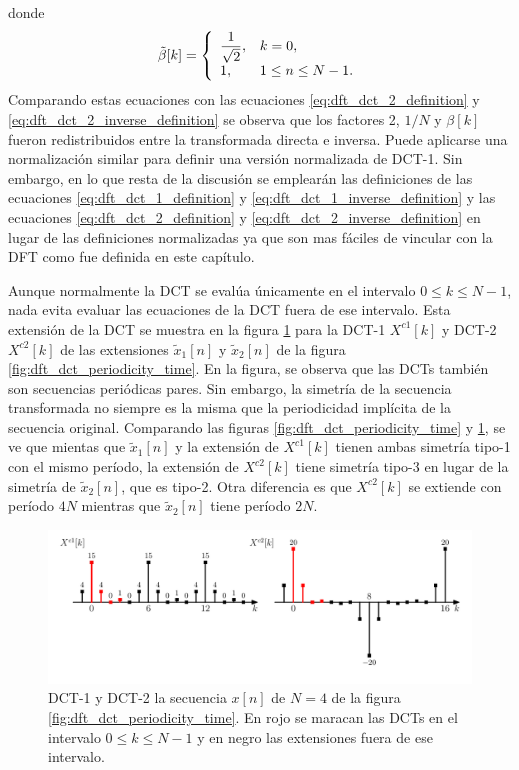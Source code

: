 \documentclass[a4paper]{report}
\begin{document}
donde
\[
 \tilde{\beta}[k]=
 \left\{ 
 \begin{array}{ll}
  \dfrac{1}{\sqrt{2}}, & k=0,\\[\medskipamount]
  1, & 1\leq n\leq N-1.
 \end{array}
 \right.  
\]
Comparando estas ecuaciones con las ecuaciones \ref{eq:dft_dct_2_definition} y \ref{eq:dft_dct_2_inverse_definition} se observa que los factores 2, \(1/N\) y \(\beta[k]\) fueron redistribuidos entre la transformada directa e inversa. Puede aplicarse una normalización similar para definir una versión normalizada de DCT-1. Sin embargo, en lo que resta de la discusión se emplearán las definiciones de las ecuaciones  \ref{eq:dft_dct_1_definition} y \ref{eq:dft_dct_1_inverse_definition} y las ecuaciones  \ref{eq:dft_dct_2_definition} y \ref{eq:dft_dct_2_inverse_definition} en lugar de las definiciones normalizadas ya que son mas fáciles de vincular con la DFT como fue definida en este capítulo.

Aunque normalmente la DCT se evalúa únicamente en el intervalo \(0\leq k\leq N-1\), nada evita evaluar las ecuaciones de la DCT fuera de ese intervalo. Esta extensión de la DCT se muestra en la figura \ref{fig:dft_dct_periodicity_types_1_2_dct} para la DCT-1 \(X^{c1}[k]\) y DCT-2 \(X^{c2}[k]\) de las extensiones \(\tilde{x}_1[n]\) y \(\tilde{x}_2[n]\) de la figura \ref{fig:dft_dct_periodicity_time}. En la figura, se observa que las DCTs también son secuencias periódicas pares. Sin embargo, la simetría de la secuencia transformada no siempre es la misma que la periodicidad implícita de la secuencia original. Comparando las figuras \ref{fig:dft_dct_periodicity_time} y \ref{fig:dft_dct_periodicity_types_1_2_dct}, se ve que mientas que \(\tilde{x}_1[n]\) y la extensión de \(X^{c1}[k]\) tienen ambas simetría tipo-1 con el mismo período, la extensión de \(X^{c2}[k]\) tiene simetría tipo-3 en lugar de la simetría de \(\tilde{x}_2[n]\), que es tipo-2. Otra diferencia es que \(X^{c2}[k]\) se extiende con período \(4N\) mientras que \(\tilde{x}_2[n]\) tiene período \(2N\).
\begin{figure}[!htb]
 \begin{center}
 \includegraphics[width=\textwidth]{figuras/dft_dct_periodicity_types_1_2_dct.pdf}
 \caption{\label{fig:dft_dct_periodicity_types_1_2_dct} DCT-1 y DCT-2 la secuencia \(x[n]\) de \(N=4\) de la figura \ref{fig:dft_dct_periodicity_time}. En rojo se maracan las DCTs en el intervalo \(0\leq k\leq N-1\) y en negro las extensiones fuera de ese intervalo.}
 \end{center}
\end{figure}
\end{document}
